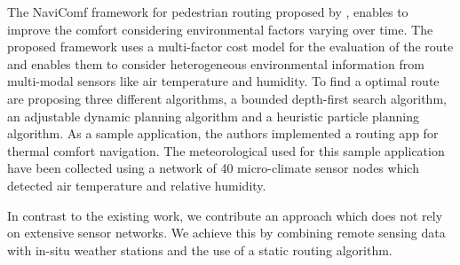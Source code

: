 The NaviComf framework for pedestrian routing proposed by \textcite{Dang2013}, enables to improve the comfort considering environmental factors varying over time. The proposed framework uses a multi-factor cost model for the evaluation of the route and enables them to consider heterogeneous environmental information from multi-modal sensors like air temperature and humidity. To find a optimal route \textcite{Dang2013} are proposing three different algorithms,  a bounded depth-first search algorithm, an adjustable dynamic planning algorithm and a heuristic particle planning algorithm. As a sample application, the authors implemented a routing app for thermal comfort navigation. The meteorological used for this sample application have been collected using a network of 40 micro-climate sensor nodes which detected air temperature and relative humidity. 

In contrast to the existing work, we contribute an approach which does not rely on extensive sensor networks. We achieve this by combining remote sensing data with in-situ weather stations and the use of a static routing algorithm.